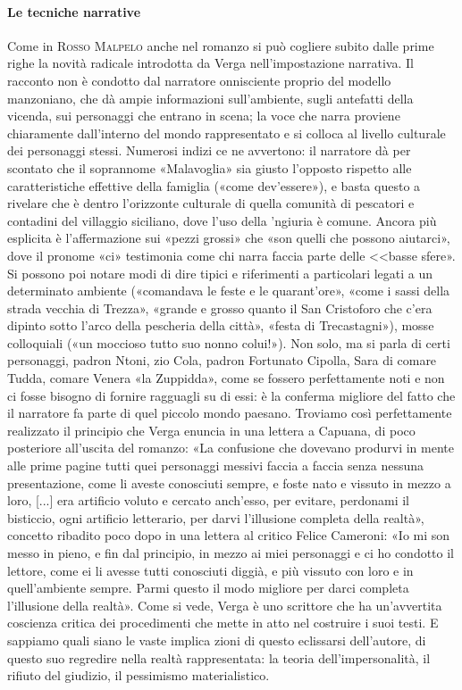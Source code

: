 \documentclass{book}
\newcounter{mar}
\begin{document}
\paragraph{Le tecniche narrative} Come in \textsc{Rosso Malpelo} anche nel romanzo si può cogliere subito dalle prime
righe la novità radicale introdotta da Verga nell'impostazione narrativa. Il racconto non è condotto dal narratore onnisciente proprio del modello manzoniano, che dà ampie informazioni sull'ambiente, sugli antefatti della vicenda, sui personaggi che entrano in scena; la voce che narra proviene chiaramente dall'interno del mondo rappresentato e si colloca al livello culturale dei personaggi stessi. Numerosi indizi ce ne avvertono: il narratore dà per scontato che il soprannome «Malavoglia» sia giusto l'opposto rispetto alle caratteristiche effettive della famiglia («come dev'essere»), e basta questo a rivelare che è dentro l'orizzonte culturale di quella comunità di pescatori e contadini del villaggio siciliano, dove l'uso della 'ngiuria è comune. Ancora più esplicita è l'affermazione sui «pezzi grossi» che «son quelli che possono aiutarci», dove il pronome «ci» testimonia come chi narra faccia parte delle <<basse sfere». Si possono poi notare modi di dire tipici e riferimenti a particolari legati a un determinato ambiente («comandava le feste e le quarant'ore», «come i sassi della strada vecchia di Trezza», «grande e grosso quanto il San Cristoforo che c'era dipinto sotto l'arco della pescheria della città», «festa di Trecastagni»), mosse colloquiali («un moccioso tutto suo nonno colui!»). Non solo, ma si parla di certi personaggi, padron Ntoni, zio Cola, padron Fortunato Cipolla, Sara di comare Tudda, comare Venera «la Zuppidda», come se fossero perfettamente noti e non ci fosse bisogno di fornire ragguagli su di essi: è la conferma migliore del fatto che il narratore fa parte di quel piccolo mondo paesano. Troviamo così perfettamente realizzato il principio che Verga enuncia in una lettera a Capuana, di poco posteriore all'uscita del romanzo: «La confusione che dovevano produrvi in mente alle prime pagine tutti quei personaggi messivi faccia a faccia senza nessuna presentazione, come li aveste conosciuti sempre, e foste nato e vissuto in mezzo a loro, [...] era artificio voluto e cercato anch'esso, per evitare, perdonami il bisticcio, ogni artificio letterario, per darvi l'illusione completa della realtà», concetto ribadito poco dopo in una lettera al critico Felice Cameroni: «Io mi son messo in pieno, e fin dal principio, in mezzo ai miei personaggi e ci ho condotto il lettore, come ei li avesse tutti conosciuti diggià, e più vissuto con loro e in quell'ambiente sempre. Parmi questo il modo migliore per darci completa l'illusione della realtà». Come si vede, Verga è uno scrittore che ha un'avvertita coscienza critica dei procedimenti che mette in atto nel costruire i suoi testi. E sappiamo quali siano le vaste implica zioni di questo eclissarsi dell'autore, di questo suo regredire nella realtà rappresentata: la teoria dell'impersonalità, il rifiuto del giudizio, il pessimismo materialistico.
\end{document}
